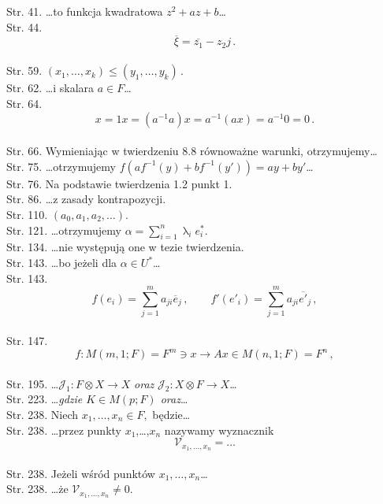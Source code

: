 \documentclass[a4paper,11pt]{article}
\numberwithin{equation}{section}
\renewcommand{\lambda}{\uplambda}
\begin{document}
\VerSpaceTwo


Str. 41. \ldots to funkcja kwadratowa $z^2+az+b$\ldots \\
Str. 44.
  $$\overline{ \xi } = \overline{ z_{ 1 } } - z_{ 2 } j \, .$$ \\
Str. 59. $( x_{ 1 }, \ldots, x_{ k } ) \leq ( y_{ 1 }, \ldots, y_{ k } ) \, .$ \\
Str. 62. \ldots i skalara $a \in F$\ldots \\

Str. 64.
  $$x = 1 x = ( a^{ -1 } a ) x = a^{ -1 }( a x ) = a^{ -1 } 0 = 0 \,
  .$$ \\
Str. 66. Wymieniając w twierdzeniu 8.8 równoważne warunki,
otrzymujemy\ldots \\
Str. 75. \ldots otrzymujemy
$f( a f^{ -1 }( y ) + b f^{ -1 } ( y' ) ) = a y + b y'$\ldots \\
Str. 76. Na podstawie twierdzenia 1.2 punkt 1. \\
Str. 86. \ldots z zasady kontrapozycji. \\
Str. 110. $( a_{ 0 }, a_{ 1 }, a_{ 2 }, \ldots )$. \\
Str. 121. \ldots otrzymujemy
$\alpha = \sum_{ i = 1 }^{ n } \lambda_{ i } e^{ * }_{ i } .$ \\
Str. 134. \ldots nie występują one w tezie twierdzenia. \\
Str. 143. \ldots bo jeżeli dla $\alpha \in U^{ * }$\ldots \\
Str. 143.
  $$f( e_{ i } ) = \sum_{ j = 1 }^{ m } a_{ j i } \overline{ { e } }_{
    j } \, , \qquad f'( e'_{ i } ) = \sum_{ j = 1 }^{ m } a_{ j i } \overline{
    { e }' }_{ j } \, ,$$ \\
Str. 147.
$$f : M( m, 1; F ) = F^{ m } \ni x \longrightarrow A x \in M( n, 1 ;
F ) = F^{ n } \, ,$$ \\
Str. 195.
\ldots$\mathcal{ J }_{ 1 } : F \otimes X \rightarrow X$ \textit{oraz}
$\mathcal{ J }_{ 2 } : X \otimes F \rightarrow X$\ldots \\
Str. 223. \ldots\textit{gdzie $K \in M( p; F )$ oraz}\ldots \\
Str. 238. Niech $x_{ 1 }, \ldots, x_{ n } \in F ,$ będzie\ldots \\
Str. 238. \ldots przez punkty $x_{ 1 }$,\ldots,$x_{ n }$ nazywamy
wyznacznik
$$\mathcal{ V }_{ x_{ 1 }, \ldots, x_{ n } } = \ldots$$ \\
Str. 238. Jeżeli wśród punktów $x_{ 1 },\ldots, x_{ n }$\ldots \\
Str. 238. \ldots że $\mathcal{ V }_{ x_{ 1 }, \ldots, x_{ n } } \neq 0 .$ \\
\end{document}
